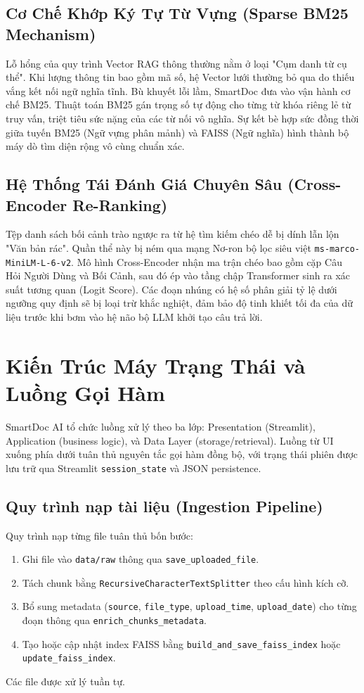 \documentclass[10pt, conference, a4paper, compsocconf]{IEEEtran}
\begin{document}
\subsection{Cơ Chế Khớp Ký Tự Từ Vựng (Sparse BM25 Mechanism)}
Lỗ hổng của quy trình Vector RAG thông thường nằm ở loại "Cụm danh từ cụ thể". Khi lượng thông tin bao gồm mã số, hệ Vector lưới thường bỏ qua do thiếu vắng kết nối ngữ nghĩa tĩnh. Bù khuyết lỗi lầm, SmartDoc đưa vào vận hành cơ chế BM25.
Thuật toán BM25 gán trọng số tự động cho từng từ khóa riêng lẻ từ truy vấn, triệt tiêu sức nặng của các từ nối vô nghĩa. Sự kết bè hợp sức đồng thời giữa tuyến BM25 (Ngữ vựng phân mảnh) và FAISS (Ngữ nghĩa) hình thành bộ máy dò tìm diện rộng vô cùng chuẩn xác.

\subsection{Hệ Thống Tái Đánh Giá Chuyên Sâu (Cross-Encoder Re-Ranking)}
Tệp danh sách bối cảnh trào ngược ra từ hệ tìm kiếm chéo dễ bị dính lẫn lộn "Văn bản rác". Quần thể này bị ném qua mạng Nơ-ron bộ lọc siêu việt \texttt{ms-marco-MiniLM-L-6-v2}.
Mô hình Cross-Encoder nhận ma trận chéo bao gồm cặp Câu Hỏi Người Dùng và Bối Cảnh, sau đó ép vào tầng chập Transformer sinh ra xác suất tương quan (Logit Score). Các đoạn nhúng có hệ số phân giải tỷ lệ dưới ngưỡng quy định sẽ bị loại trừ khắc nghiệt, đảm bảo độ tinh khiết tối đa của dữ liệu trước khi bơm vào hệ não bộ LLM khởi tạo câu trả lời.

\section{Kiến Trúc Máy Trạng Thái và Luồng Gọi Hàm}

SmartDoc AI tổ chức luồng xử lý theo ba lớp: Presentation (Streamlit), Application (business logic), và Data Layer (storage/retrieval). Luồng từ UI xuống phía dưới tuân thủ nguyên tắc gọi hàm đồng bộ, với trạng thái phiên được lưu trữ qua Streamlit \texttt{session\_state} và JSON persistence.

\subsection{Quy trình nạp tài liệu (Ingestion Pipeline)}
Quy trình nạp từng file tuân thủ bốn bước:
\begin{enumerate}
\RaggedRight
\item Ghi file vào \texttt{data/raw} thông qua \texttt{save\_uploaded\_file}.
\item Tách chunk bằng \texttt{RecursiveCharacterTextSplitter} theo cấu hình kích cỡ.
\item Bổ sung metadata (\texttt{source}, \texttt{file\_type}, \texttt{upload\_time}, \texttt{upload\_date}) cho từng đoạn thông qua \texttt{enrich\_chunks\_metadata}.
\item Tạo hoặc cập nhật index FAISS bằng \texttt{build\_and\_save\_faiss\_index} hoặc \texttt{update\_faiss\_index}.
\end{enumerate}
Các file được xử lý tuần tự.
\end{document}
